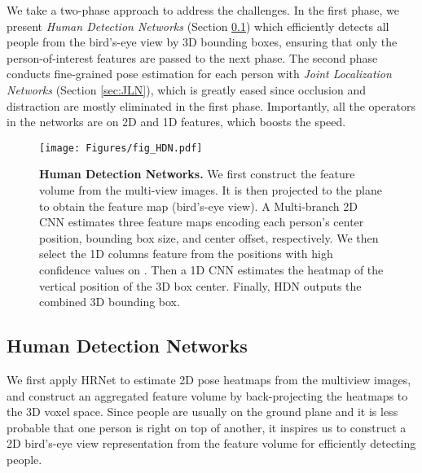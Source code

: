 We take a two-phase approach to address the challenges. In the first phase, we present \textit{Human Detection Networks} (Section \ref{sec:hdn}) which efficiently detects all people from the bird's-eye view by 3D bounding boxes, ensuring that only the person-of-interest features are passed to the next phase.  The second phase conducts fine-grained pose estimation for each person with \textit{Joint Localization Networks} (Section \ref{sec:JLN}), which is greatly eased since occlusion and distraction are mostly eliminated in the first phase. Importantly, all the operators in the networks are on 2D and 1D features, which boosts the speed. 





















\begin{figure*}[t]
  \centering
  \texttt{[image: Figures/fig\_HDN.pdf]}
  \caption{\textbf{Human Detection Networks.} We first construct the feature volume  from the multi-view images. It is then projected to the  plane to obtain the feature map  (bird's-eye view). A Multi-branch 2D CNN estimates three feature maps encoding each person's center position, bounding box size, and center offset, respectively. We then select the 1D columns feature  from the positions with high confidence values on . Then a 1D CNN estimates the heatmap  of the vertical position of the 3D box center. Finally, HDN outputs the combined 3D bounding box.
  }
  \label{fig:hdn}
\end{figure*}

\subsection{Human Detection Networks}
\label{sec:hdn}
We first apply HRNet\cite{sun2019deep} to estimate 2D pose heatmaps from the multiview images, and construct an aggregated feature volume  by back-projecting the heatmaps to the 3D voxel space. Since people are usually on the ground plane and it is less probable that one person is right on top of another, it inspires us to construct a 2D bird's-eye view representation from the feature volume for efficiently detecting people.

